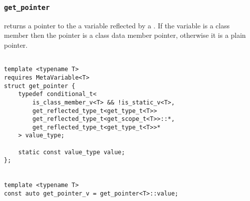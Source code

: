 
\subsubsection{\texttt{get\_pointer}}

returns a pointer to the a variable reflected by a .   If the variable is a class member then the pointer is a class data member pointer,   otherwise it is a plain pointer.

\begin{verbatim}

template <typename T>
requires MetaVariable<T>
struct get_pointer {
	typedef conditional_t<
		is_class_member_v<T> && !is_static_v<T>,
		get_reflected_type_t<get_type_t<T>>
		get_reflected_type_t<get_scope_t<T>>::*,
		get_reflected_type_t<get_type_t<T>>*
	> value_type;

	static const value_type value;
};


template <typename T>
const auto get_pointer_v = get_pointer<T>::value;

\end{verbatim}
